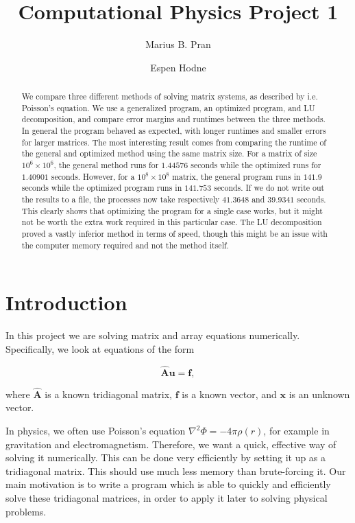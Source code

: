 \documentclass[10pt,showpacs,preprintnumbers,footinbib,amsmath,amssymb,aps,prl,twocolumn,groupedaddress,superscriptaddress,showkeys]{revtex4-1}
\begin{document}
\title[CPP1]{Computational Physics Project 1}

\author{Marius B. Pran}
\author{Espen Hodne} 


\begin{abstract}
We compare three different methods of solving matrix systems, as described by i.e. Poisson's equation. We use a generalized program, an optimized program, and LU decomposition, and compare error margins and runtimes between the three methods. In general the program behaved as expected, with longer runtimes and smaller errors for larger matrices. The most interesting result comes from comparing the runtime of the general and optimized method using the same matrix size. For a matrix of size $10^6\times10^6$, the general method runs for $1.44576$ seconds while the optimized runs for $1.40901$ seconds. However, for a $10^8\times10^8$ matrix, the general program runs in $141.9$ seconds while the optimized program runs in $141.753$ seconds. If we do not write out the results to a file, the processes now take respectively $41.3648$ and $39.9341$ seconds. This clearly shows that optimizing the program for a single case works, but it might not be worth the extra work required in this particular case. The LU decomposition proved a vastly inferior method in terms of speed, though this might be an issue with the computer memory required and not the method itself. 
\end{abstract}



\maketitle



\section{Introduction}

In this project we are solving matrix and array equations numerically. Specifically, we look at equations of the form 

$$
\mathbf{\hat{A}} \mathbf{u} = \mathbf{f},
$$

where $\mathbf{\hat{A}}$ is a known tridiagonal matrix, $\mathbf{f}$ is a known vector, and $\mathbf{x}$ is an unknown vector.


In physics, we often use Poisson's equation $\nabla^2\Phi = -4\pi\rho(r)$, for example in gravitation and electromagnetism. Therefore, we want a quick, effective way of solving it numerically. This can be done very efficiently by setting it up as a tridiagonal matrix. This should use much less memory than brute-forcing it. Our main motivation is to write a program which is able to quickly and efficiently solve these tridiagonal matrices, in order to apply it later to solving physical problems.
\end{document}
